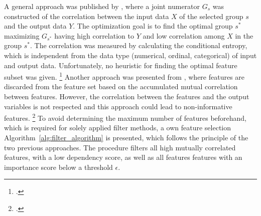 A general approach was published by \cite{hall_feature_1997},
where a joint numerator $G_s$ was constructed of the correlation between the input data $X$ of the selected group $s$ and the output data $Y$.
The optimization goal is to find the optimal group $s^*$ maximizing $G_{s^*}$ having high correlation to $Y$ and low
correlation among $X$ in the group $s^*$. The correlation was measured by calculating the conditional entropy, which is independent
from the data type (numerical, ordinal, categorical) of input and output data. Unfortunately, no heuristic for finding the optimal
feature subset was given. \footcite[cf.][p.856]{hall_feature_1997} Another approach was presented from \cite{haindl_feature_2006},
where features are discarded from the feature set based on the accumulated mutual correlation between features. However, the correlation between
the features and the output variables is not respected and this approach could lead to non-informative features. \footcite[cf.][]{haindl_feature_2006}
To avoid determining the maximum number of features beforehand, which is required for solely applied filter methods,
a own feature selection Algorithm~\ref{alg:filter_algorithm} is presented, which follows the principle of the two previous approaches.
The procedure filters all  high mutually correlated features, with a low dependency score, as well as all features features with an
importance score below a threshold $\epsilon$.



